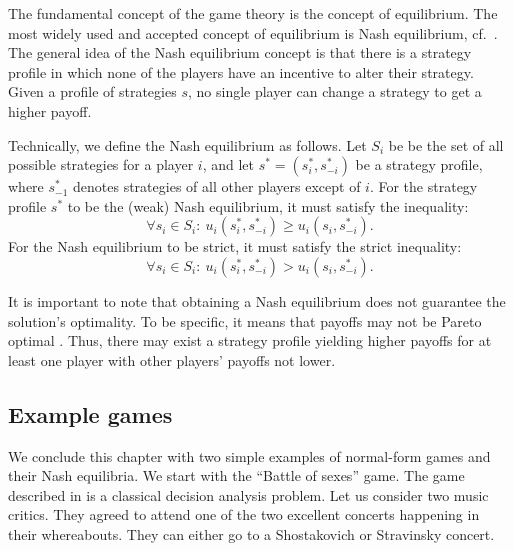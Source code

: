 \documentclass[english, twoside, 12pt, a4paper]{article}
\theoremstyle{definition}
\theoremstyle{plain}
\theoremstyle{remark}
\begin{document}
The fundamental concept of the game theory is the concept of equilibrium. The most widely used and accepted concept of equilibrium is Nash equilibrium, cf.~\cite{nash1951non}. The general idea of the Nash equilibrium concept is that there is a strategy profile in which none of the players have an incentive to alter their strategy. Given a profile of strategies \(s\), no single player can change a strategy to get a higher payoff.

Technically, we define the Nash equilibrium as follows. Let $S_i$ be be the set of all possible strategies for a player $i$, and let $s^* = (s^*_i, s_{-i}^*)$ be a strategy profile, where $s_{-1}^*$ denotes strategies of all other players except of $i$. For the strategy profile $s^*$ to be the (weak) Nash equilibrium, it must satisfy the inequality:
\[
\forall s_i \in S_i:\:u_i(s_i^*, s_{-i}^*) \geq u_i(s_i, s_{-i}^*).
\]
For the Nash equilibrium to be strict, it must satisfy the strict inequality:
\[
\forall s_i \in S_i:\:u_i(s_i^*, s_{-i}^*) > u_i(s_i, s_{-i}^*).
\]

It is important to note that obtaining a Nash equilibrium does not guarantee the solution's optimality. To be specific, it means that payoffs may not be Pareto optimal \citep{wozny2012lecture}. Thus, there may exist a strategy profile yielding higher payoffs for at least one player with other players' payoffs not lower.

\subsection{Example games}

We conclude this chapter with two simple examples of normal-form games and their Nash equilibria. We start with the \enquote{Battle of sexes} game. The game described in \cite{luce1989games} is a classical decision analysis problem. Let us consider two music critics. They agreed to attend one of the two excellent concerts happening in their whereabouts. They can either go to a Shostakovich or Stravinsky concert. 
\end{document}
